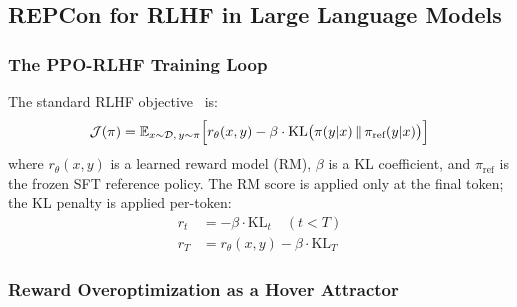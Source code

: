 \documentclass{article}
\begin{document}
\subsection{REPCon for RLHF in Large Language Models}
\label{app:rlhf}

\subsubsection{The PPO-RLHF Training Loop}

The standard RLHF objective~\citep{ouyang2022instructgpt} is:
\begin{equation}
    \mathcal{J}(\pi) = \mathbb{E}_{x \sim \mathcal{D},\, y \sim \pi}
    \Bigl[ r_\theta(x,y) - \beta \cdot \mathrm{KL}\bigl(\pi(y|x) \,\|\, \pi_\text{ref}(y|x)\bigr) \Bigr]
\end{equation}
where $r_\theta(x,y)$ is a learned reward model (RM), $\beta$ is a KL coefficient,
and $\pi_\text{ref}$ is the frozen SFT reference policy.
The RM score is applied only at the final token; the KL penalty is applied per-token:
\begin{align}
    r_t &= -\beta \cdot \mathrm{KL}_t \quad (t < T) \\
    r_T &= r_\theta(x,y) - \beta \cdot \mathrm{KL}_T
\end{align}

\subsubsection{Reward Overoptimization as a Hover Attractor}
\end{document}
